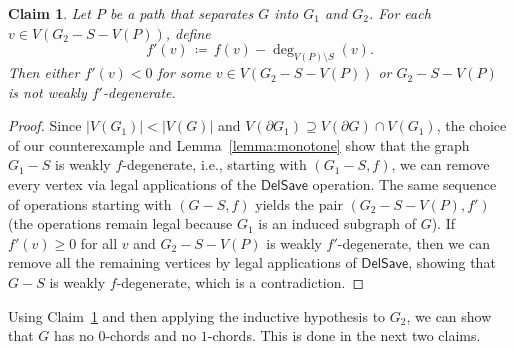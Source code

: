 \documentclass[11pt]{article}
\theoremstyle{slantthm}
\newtheorem{claim}{Claim}%
\numberwithin{equation}{section}
\theoremstyle{definition}
\renewcommand{\geq}{\geqslant}
\newcommand{\defeq}{\coloneqq}
\numberwithin{equation}{section}
\newcommand{\0}{\varnothing}
\newcommand{\delsave}{\mathsf{DelSave}}
\newcommand{\bdry}[1]{{\partial #1}}
\begin{document}
    \begin{claim}\label{claim:split}
        Let $P$ be a path that separates $G$ into $G_1$ and $G_2$. For each $v \in V(G_2 - S - V(P))$, define
        \[
            f'(v) \,\defeq\, f(v) - \deg_{V(P) \setminus S}(v).
        \]
        Then either $f'(v) < 0$ for some $v \in V(G_2 - S - V(P))$ or $G_2 - S - V(P)$ is not weakly $f'$-degenerate.
    \end{claim}
    \begin{proof}
        Since $|V(G_1)| < |V(G)|$ and $V(\bdry{G_1}) \supseteq V(\bdry{G}) \cap V(G_1)$, the choice of our counterexample and Lemma~\ref{lemma:monotone} show that the graph $G_1 - S$ is weakly $f$-degenerate, i.e., starting with $(G_1 - S, f)$, we can remove every vertex via legal applications of the $\delsave$ operation. The same sequence of operations starting with $(G-S, f)$ yields the pair $(G_2 - S - V(P), f')$ (the operations remain legal because $G_1$ is an induced subgraph of $G$). If $f'(v) \geq 0$ for all $v$ and $G_2 - S - V(P)$ is weakly $f'$-degenerate, then we can remove all the remaining vertices by legal applications of $\delsave$, showing that $G - S$ is weakly $f$-degenerate, which is a contradiction. 
    \end{proof}

    Using Claim~\ref{claim:split} and then applying the inductive hypothesis to $G_2$, we can show that $G$ has no $0$-chords and no $1$-chords. This is done in the next two claims.
\end{document}
